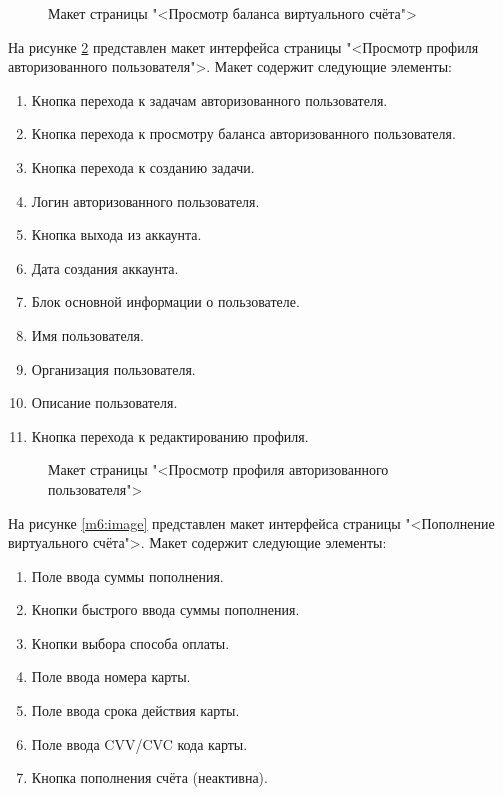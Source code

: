 \begin{figure}[ht]
	\caption{Макет страницы "<Просмотр баланса виртуального счёта">}
	\label{m4:image}
\end{figure}

На рисунке \ref{m5:image} представлен макет интерфейса страницы "<Просмотр профиля авторизованного пользователя">. Макет содержит следующие элементы:

\begin{enumerate}
	\item Кнопка перехода к задачам авторизованного пользователя.
	\item Кнопка перехода к просмотру баланса авторизованного пользователя.
	\item Кнопка перехода к созданию задачи.
	\item Логин авторизованного пользователя.
	\item Кнопка выхода из аккаунта.
	\item Дата создания аккаунта.
	\item Блок основной информации о пользователе.
	\item Имя пользователя.
	\item Организация пользователя.
	\item Описание пользователя.
	\item Кнопка перехода к редактированию профиля.
\end{enumerate}
\clearpage

\begin{figure}[ht]
	\caption{Макет страницы "<Просмотр профиля авторизованного пользователя">}
	\label{m5:image}
\end{figure}

На рисунке \ref{m6:image} представлен макет интерфейса страницы "<Пополнение виртуального счёта">. Макет содержит следующие элементы:

\begin{enumerate}
	\item Поле ввода суммы пополнения.
	\item Кнопки быстрого ввода суммы пополнения.
	\item Кнопки выбора способа оплаты.
	\item Поле ввода номера карты.
	\item Поле ввода срока действия карты.
	\item Поле ввода CVV/CVC кода карты.
	\item Кнопка пополнения счёта (неактивна).
\end{enumerate}
\clearpage

